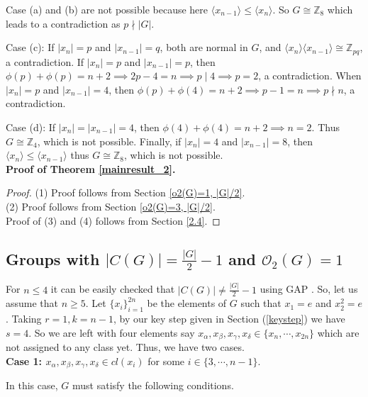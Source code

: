 \documentclass[a4paper,11pt]{amsart}
\numberwithin{equation}{section}
\numberwithin{equation}{subsection}
\begin{document}
Case (a) and (b) are not possible because here $\langle x_{n-1}\rangle \leq \langle x _{n} \rangle$. So $G\cong \mathbb{Z}_{8}$ which leads to a contradiction as $p\nmid |G|$.

Case (c):
If $|x_{n}|=p$ and  $|x_{n-1}|=q$,  both are normal in $G$, and  $\langle x_{n} \rangle\langle x_{n-1} \rangle \cong\mathbb{Z}_{pq}$, a contradiction. 
If $|x_{n}|=p$ and  $|x_{n-1}|=p$, then $\phi(p) + \phi(p)=n+2\implies 2p-4=n \implies p\mid 4\implies p=2$, a contradiction. 
When $|x_{n}|=p$ and  $|x_{n-1}|=4$, then $\phi(p) + \phi(4)=n+2\implies p-1=n \implies p\nmid n$, a contradiction. 

Case (d): If $|x_{n}|=|x_{n-1}|=4$, then $\phi{(4)}+\phi{(4)}=n+2\implies n=2$. Thus $G\cong \mathbb{Z}_4$, which is not possible. Finally, if $|x_{n}|=4$ and $|x_{n-1}|=8$, then $\langle x_{n}\rangle \leq \langle x_{n-1}\rangle$ thus $G\cong \mathbb{Z}_{8}$, which is not possible.\\

 




\noindent \textbf{Proof of Theorem \ref{mainresult_2}.}
\begin{proof}
 (1)  Proof follows from Section \ref{o2(G)=1, |G|/2}.\\
 (2) Proof follows from Section \ref{o2(G)=3, |G|/2}.\\
Proof of (3) and (4) follows from Section \ref{2.4}.
\end{proof}


\subsection{Groups with \texorpdfstring{$|C(G)|=\frac{|G|}{2}-1$}{|C(G)|=|G|/2-1} and \texorpdfstring{$\mathcal{O}_2(G)=1$}{O2(G)=1}}\label{o2G=1, |G|/2-1} 
 For $n \leq 4$ it can be easily checked that $|C(G)| \neq \frac{|G|}{2}-1$ using GAP \cite{GAP}. So, let us assume that $n\geq 5$. Let $\{x_i\}_{i=1}^{2n}$ be the elements of $G$ such that $x_1 = e$ and $x_2^2 = e$. 
 Taking $r=1, k=n-1$,  by our key step given in Section (\ref{keystep}) we have $s=4$. So we are left with four elements say $x_\alpha , x_\beta,x_{\gamma},x_{\delta} \in \{x_{n}, \cdots, x_{2n}\}$ which are not assigned to any class yet. Thus, we have two cases.\\  
  \textbf{Case 1: $x_{\alpha},x_{\beta},x_{\gamma},x_{\delta} \in cl(x_{i})$} for some $i\in\{3,\cdots,n-1\}$.


In this case, $G$ must satisfy the following conditions.
\end{document}
